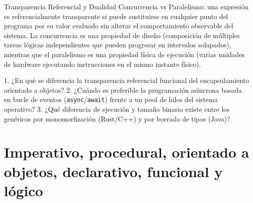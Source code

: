 \documentclass{book}
\begin{document}
\begin{tcolorbox}[title={Definición}, studiumdef, breakable]

Transparencia Referencial y Dualidad Concurrencia vs Paralelismo: una expresión es referencialmente transparente si puede sustituirse en cualquier punto del programa por su valor evaluado sin alterar el comportamiento observable del sistema. La concurrencia es una propiedad de diseño (composición de múltiples tareas lógicas independientes que pueden progresar en intervalos solapados), mientras que el paralelismo es una propiedad física de ejecución (varias unidades de hardware ejecutando instrucciones en el mismo instante físico).
\end{tcolorbox}

\begin{tcolorbox}[title={Autoficha}, studiumcheck, breakable]

1. ¿En qué se diferencia la transparencia referencial funcional del encapsulamiento orientado a objetos? 2. ¿Cuándo es preferible la programación asíncrona basada en bucle de eventos (\texttt{async}/\texttt{await}) frente a un pool de hilos del sistema operativo? 3. ¿Qué diferencia de ejecución y tamaño binario existe entre los genéricos por monomorfización (Rust/C++) y por borrado de tipos (Java)?
\end{tcolorbox}

\section{Imperativo, procedural, orientado a objetos, declarativo, funcional y lógico}
\end{document}
